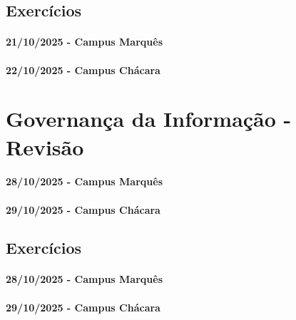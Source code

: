 \documentclass[
]{book}
\begin{document}
\section{Exercícios}\label{exercuxedcios-9}

\subsubsection*{21/10/2025 - Campus Marquês}\label{campus-marquuxeas-15}

\subsubsection*{22/10/2025 - Campus Chácara}\label{campus-chuxe1cara-15}

\chapter{Governança da Informação - Revisão}\label{governanuxe7a-da-informauxe7uxe3o---revisuxe3o}

\subsubsection*{28/10/2025 - Campus Marquês}\label{campus-marquuxeas-16}

\subsubsection*{29/10/2025 - Campus Chácara}\label{campus-chuxe1cara-16}

\section{Exercícios}\label{exercuxedcios-10}

\subsubsection*{28/10/2025 - Campus Marquês}\label{campus-marquuxeas-17}

\subsubsection*{29/10/2025 - Campus Chácara}\label{campus-chuxe1cara-17}

  
\end{document}
